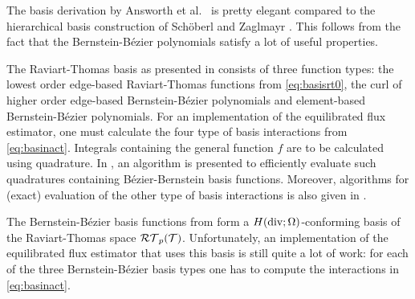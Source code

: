 \documentclass[thesis.tex]{subfiles}
\begin{document}
  The basis derivation  by Answorth et al.~\cite{ainsworthbernstein} is pretty elegant
  compared to the hierarchical basis construction of Sch\"oberl and Zaglmayr \cite{schoberl2005high}.
  This follows from the fact that the Bernstein-B\'ezier polynomials satisfy a lot of useful properties.


  The Raviart-Thomas basis as presented in \cite{ainsworthbernstein} consists of three function types: the lowest order edge-based Raviart-Thomas functions from 
  \eqref{eq:basisrt0}, the curl of higher order edge-based Bernstein-B\'ezier polynomials and element-based Bernstein-B\'ezier polynomials.
  For an implementation of the equilibrated flux estimator, one must calculate the four type of basis interactions from \eqref{eq:basinact}.
  Integrals containing the general function $f$ are to be calculated using quadrature.
  In \cite{ainsworth}, an algorithm is presented to efficiently evaluate
  such quadratures containing B\'ezier-Bernstein basis functions. Moreover, algorithms
  for (exact) evaluation of the other type of basis interactions is also given in \cite{ainsworth}. 

  The Bernstein-B\'ezier basis functions from \cite{ainsworthbernstein} form a $H(\operatorname{div};\Omega)$-conforming basis 
  of the Raviart-Thomas space $\mathcal{RT}_p(\mathcal{T})$.
  Unfortunately, an implementation of the equilibrated flux estimator that uses this basis is still quite a lot of work:
  for each of the three Bernstein-B\'ezier basis types one has to compute the interactions in \eqref{eq:basinact}. 
\end{document}
